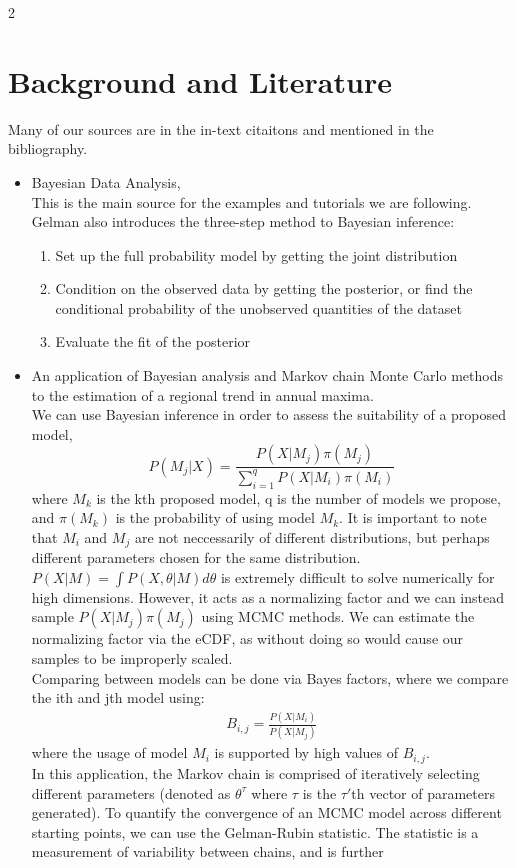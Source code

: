 \documentclass[10pt]{article}
\begin{document}
\begin{multicols*}{2}
\section{Background and Literature}
Many of our sources are in the in-text citaitons and mentioned in the bibliography. \\
\begin{itemize}[nosep]
 \item Bayesian Data Analysis, \citet{gelman_bayesian_2014} \\
	This is the main source for the examples and tutorials we are following.
	Gelman also introduces the three-step method to Bayesian inference:
	\begin{enumerate}[nosep]
		\item Set up the full probability model by getting the joint distribution
		\item Condition on the observed data by getting the posterior, or find the conditional probability of the unobserved quantities of the dataset
		\item Evaluate the fit of the posterior
	\end{enumerate}
  \item An application of Bayesian analysis and Markov chain Monte Carlo methods to the estimation of a regional trend in annual maxima. \citet{renard_application_2006} \\
We can use Bayesian inference in order to assess the suitability of a proposed model,
$$
P(M_j|X) = \frac{P(X|M_j)\pi(M_j)}{\sum_{i=1}^{q}P(X|M_i)\pi(M_i)}
$$
where $M_k$ is the kth proposed model, q is the number of models we propose, and $\pi(M_k)$ is the probability of using model $M_k$.  It is important to note that $M_i$ and $M_j$ are not neccessarily of different distributions, but perhaps different parameters chosen for the same distribution.
$P(X|M) = \int P(X,\theta|M)d\theta$ is extremely difficult to solve numerically for high dimensions.  However, it acts as a normalizing factor and we can instead sample $P(X|M_j)\pi(M_j)$ using MCMC methods.  We can estimate the normalizing factor via the eCDF, as without doing so would cause our samples to be improperly scaled. \\
Comparing between models can be done via Bayes factors, where we compare the ith and jth model using:
$$
\begin{aligned}
B_{i,j} = \frac{P(X|M_i)}{P(X|M_j)}
\end{aligned}
$$
where the usage of model $M_i$ is supported by high values of $B_{i,j}$. \\
In this application, the Markov chain is comprised of iteratively selecting different parameters (denoted as $\theta^\tau$ where $\tau$ is the $\tau'\text{th}$ vector of parameters generated).
To quantify the convergence of an MCMC model across different starting points, we can use the Gelman-Rubin statistic.  The statistic is a measurement of variability between chains, and is further 
\end{itemize}

\end{multicols*}
\end{document}
